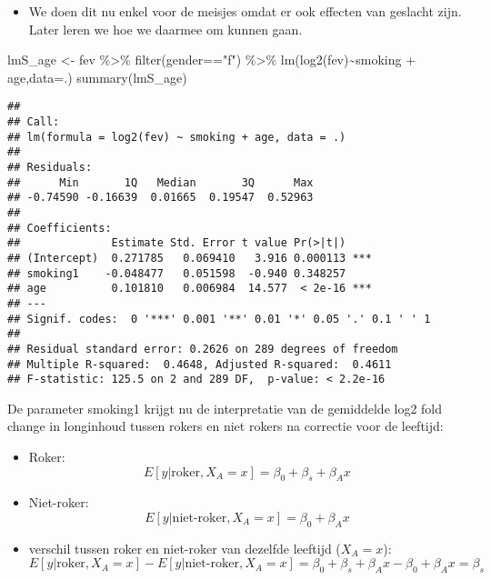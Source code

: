 \documentclass[
]{article}
\newenvironment{Shaded}{\begin{snugshade}}{\end{snugshade}}
\newcommand{\AttributeTok}[1]{\textcolor[rgb]{0.77,0.63,0.00}{#1}}
\newcommand{\FunctionTok}[1]{\textcolor[rgb]{0.00,0.00,0.00}{#1}}
\newcommand{\NormalTok}[1]{#1}
\newcommand{\OtherTok}[1]{\textcolor[rgb]{0.56,0.35,0.01}{#1}}
\newcommand{\SpecialCharTok}[1]{\textcolor[rgb]{0.00,0.00,0.00}{#1}}
\newcommand{\StringTok}[1]{\textcolor[rgb]{0.31,0.60,0.02}{#1}}
\providecommand{\tightlist}{%
  \setlength{\itemsep}{0pt}\setlength{\parskip}{0pt}}
\begin{document}
\begin{itemize}
\tightlist
\item
  We doen dit nu enkel voor de meisjes omdat er ook effecten van
  geslacht zijn. Later leren we hoe we daarmee om kunnen gaan.
\end{itemize}

\begin{Shaded}
\begin{Highlighting}[]
\NormalTok{lmS\_age }\OtherTok{\textless{}{-}}\NormalTok{ fev }\SpecialCharTok{\%\textgreater{}\%} 
  \FunctionTok{filter}\NormalTok{(gender}\SpecialCharTok{==}\StringTok{"f"}\NormalTok{) }\SpecialCharTok{\%\textgreater{}\%}
  \FunctionTok{lm}\NormalTok{(}\FunctionTok{log2}\NormalTok{(fev)}\SpecialCharTok{\textasciitilde{}}\NormalTok{smoking }\SpecialCharTok{+}\NormalTok{ age,}\AttributeTok{data=}\NormalTok{.)}
\FunctionTok{summary}\NormalTok{(lmS\_age)}
\end{Highlighting}
\end{Shaded}

\begin{verbatim}
## 
## Call:
## lm(formula = log2(fev) ~ smoking + age, data = .)
## 
## Residuals:
##      Min       1Q   Median       3Q      Max 
## -0.74590 -0.16639  0.01665  0.19547  0.52963 
## 
## Coefficients:
##              Estimate Std. Error t value Pr(>|t|)    
## (Intercept)  0.271785   0.069410   3.916 0.000113 ***
## smoking1    -0.048477   0.051598  -0.940 0.348257    
## age          0.101810   0.006984  14.577  < 2e-16 ***
## ---
## Signif. codes:  0 '***' 0.001 '**' 0.01 '*' 0.05 '.' 0.1 ' ' 1
## 
## Residual standard error: 0.2626 on 289 degrees of freedom
## Multiple R-squared:  0.4648, Adjusted R-squared:  0.4611 
## F-statistic: 125.5 on 2 and 289 DF,  p-value: < 2.2e-16
\end{verbatim}

De parameter smoking1 krijgt nu de interpretatie van de gemiddelde log2
fold change in longinhoud tussen rokers en niet rokers na correctie voor
de leeftijd:

\begin{itemize}
\tightlist
\item
  Roker: \[E[y|\text{roker}, X_A=x] = \beta_0 + \beta_s + \beta_A x\]
\item
  Niet-roker: \[E[y|\text{niet-roker}, X_A=x] = \beta_0 + \beta_A x\]
\item
  verschil tussen roker en niet-roker van dezelfde leeftijd (\(X_A=x\)):
  \[E[y|\text{roker}, X_A=x]- E[y|\text{niet-roker}, X_A=x]=\beta_0 + \beta_s + \beta_A x- \beta_0 + \beta_A x = \beta_s\]
\end{itemize}
\end{document}
